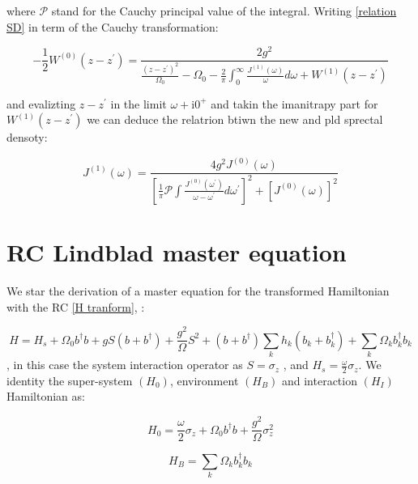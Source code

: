 \documentclass[%
preprint,
onecolumn,
notitlepag,
 amsmath,amssymb,
 aps,
 pra,
]{revtex4-2}
\begin{document}
where $\mathcal{P}$ stand for the Cauchy principal value of the integral. Writing  \eqref{relation SD} in term of the  Cauchy transformation: 

\begin{equation}
-\frac{1}{2} W^{(0)}\left(z-z^{\prime}\right)=\frac{2 g^{2}}{\frac{\left(z-z^{\prime}\right)^{2}}{\Omega_{0}}-\Omega_{0}-\frac{2}{\pi} \int_{0}^{\infty} \frac{J^{(1)}(\omega)}{\omega} d \omega+W^{(1)}\left(z-z^{\prime}\right)}
\end{equation}

and evalizting $z-z^{\prime} $ in the limit $\omega+\mathrm{i} 0^{+}$ and takin the imanitrapy part for $W^{(1)}\left(z-z^{\prime}\right)$ we can deduce the relatrion btiwn the new and pld sprectal densoty: 


\begin{equation}
J^{(1)}(\omega)=\frac{4 g^{2} J^{(0)}(\omega)}{\left[\frac{1}{\pi} \mathcal{P} \int \frac{J^{(0)}\left(\omega^{\prime}\right)}{\omega-\omega^{\prime}} d \omega^{\prime}\right]^{2}+\left[J^{(0)}(\omega)\right]^{2}}
\end{equation}



\section{RC Lindblad master equation}
\label{B:LME}


We star the derivation of a master equation for the transformed Hamiltonian with the RC \ref{H tranform},  :

\begin{equation}
    H=H_s +\Omega_0 b ^{\dagger} b  + g S \left( b + b ^{\dagger} \right) + \frac{g^2}{\Omega} S^2  + \left( b + b ^{\dagger} \right) \sum_k h_k \left( b_k + b_k ^{\dagger} \right) + \sum_{k} \Omega_k b_k ^{\dagger} b_k
\end{equation}
, in this case the system interaction operator as $S=\sigma_z$ , and $H_s= \frac{\omega}{2} \sigma_z $. We identity the super-system $(H_0)$, environment $(H_B)$ and interaction $(H_I)$ Hamiltonian as:

\begin{equation}
    H_0= \frac{\omega}{2} \sigma_z + \Omega_0 b ^{\dagger} b + \frac{g^2}{\Omega} \sigma_z^2 
\end{equation}

\begin{equation}
    H_B= \sum_{k} \Omega_k b_k ^{\dagger} b_k
\end{equation}    
\end{document}
